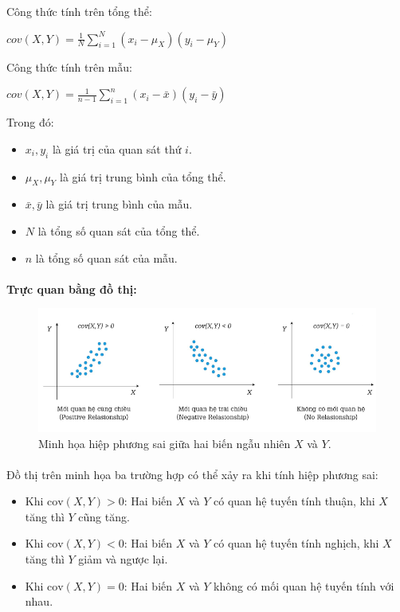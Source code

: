 Công thức tính trên tổng thể:
\begin{center}
\large $cov(X,Y) = \frac{1}{N} \sum_{i=1}^{N} (x_i - \mu_X)(y_i - \mu_Y)$
\end{center}

Công thức tính trên mẫu:
\begin{center}
\large $cov(X,Y) = \frac{1}{n-1} \sum_{i=1}^{n} (x_i - \bar{x})(y_i - \bar{y})$
\end{center}

Trong đó:
\begin{itemize}
    \item \( x_i, y_i \) là giá trị của quan sát thứ \(i\).
    \item \( \mu_X, \mu_Y \) là giá trị trung bình của tổng thể.
    \item \( \bar{x}, \bar{y} \) là giá trị trung bình của mẫu.
    \item \( N \) là tổng số quan sát của tổng thể.
    \item \( n \) là tổng số quan sát của mẫu.
\end{itemize}
\paragraph{}{\textbf{Trực quan bằng đồ thị:}}
\begin{figure}[H]
    \centering
    \includegraphics[width=\textwidth]{img/corvariance.png}
    \caption{Minh họa hiệp phương sai giữa hai biến ngẫu nhiên $X$ và $Y$.}
    \label{fig:covariance}
\end{figure}

\paragraph{}{Đồ thị trên minh họa ba trường hợp có thể xảy ra khi tính hiệp phương sai:}

\begin{itemize}
    \item Khi \(\text{cov}(X,Y) > 0\): Hai biến \(X\) và \(Y\) có quan hệ tuyến tính thuận, khi \(X\) tăng thì \(Y\) cũng tăng.
    \item Khi \(\text{cov}(X,Y) < 0\): Hai biến \(X\) và \(Y\) có quan hệ tuyến tính nghịch, khi \(X\) tăng thì \(Y\) giảm và ngược lại.
    \item Khi \(\text{cov}(X,Y) = 0\): Hai biến \(X\) và \(Y\) không có mối quan hệ tuyến tính với nhau.
\end{itemize}
